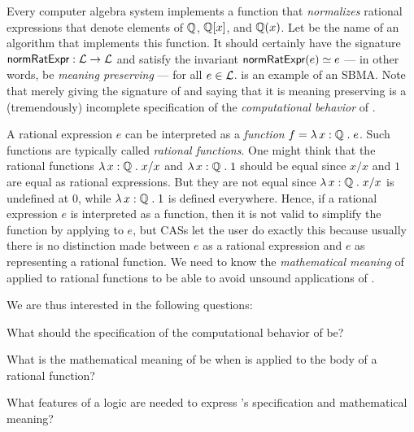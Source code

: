 \documentclass[fleqn]{llncs}
\begin{document}
Every computer algebra system implements a function that
\emph{normalizes} rational expressions that denote elements of $\mathbb{Q}$,
$\mathbb{Q}[x]$, and $\mathbb{Q}(x)$.  Let {\NRE} be the name of an algorithm that
implements this function.  It should certainly have the signature
$\mbox{\sf normRatExpr} : \mathcal{L} \rightarrow \mathcal{L}$ and satisfy the invariant $\mbox{\sf normRatExpr}(e)
\simeq e$ --- in other words, be \emph{meaning preserving} --- for all
$e \in \mathcal{L}$.  {\NRE} is an example of an SBMA.  Note that merely
giving the signature of {\NRE} and saying that it is meaning
preserving is a (tremendously) incomplete specification of the
\emph{computational behavior} of {\NRE}.

\iffalse
SBMAs can be difficult to specify since they involve an interplay of
syntax and semantics.  We have to be careful of \emph{which} semantics
is used to guide the syntactic manipulations, as different semantics
for the \textbf{same} expression can be inconsistent.
\fi

A rational expression $e$ can be interpreted as a \emph{function} $f =
\lambda\, x : \mathbb{Q} \mathrel. e$.  Such functions are typically called
\emph{rational functions}.  One might think that the rational
functions $\lambda\, x : \mathbb{Q} \mathrel. x/x$ and $\lambda\, x : \mathbb{Q} \mathrel.1$ should be equal since $x/x$ and
$1$ are equal as rational expressions.  But they are not equal since
$\lambda\, x : \mathbb{Q} \mathrel. x/x$ is undefined at 0, while $\lambda\, x : \mathbb{Q} \mathrel.1$ is defined
everywhere.  Hence, if a rational expression $e$ is interpreted as a
function, then it is not valid to simplify the function by applying
{\NRE} to $e$, but CASs let the user do exactly this because usually
there is no distinction made between $e$ as a rational expression and
$e$ as representing a rational function.  We need to know the
\emph{mathematical meaning} of {\NRE} applied to rational functions to
be able to avoid unsound applications of {\NRE}.


We are thus interested in the following questions:

\be

  \item What should the specification of the computational behavior of
    {\NRE} be?

  \item What is the mathematical meaning of {\NRE} be when {\NRE} is
    applied to the body of a rational function?

  \item What features of a logic are needed to express
    {\NRE}'s specification and mathematical meaning?
\end{document}
